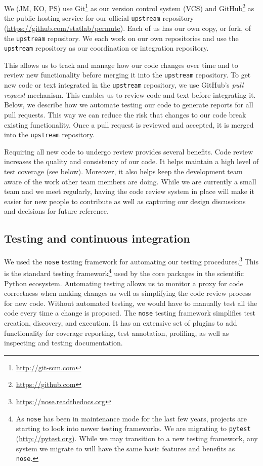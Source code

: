 \documentclass[]{article}
\begin{document}
We (JM, KO, PS) use Git\footnote{\url{http://git-scm.com}} as our version
control system (VCS) and GitHub\footnote{\url{https://github.com}} as the
public hosting service for our official \texttt{upstream} repository
(\url{https://github.com/statlab/permute}).
Each of us has our own copy, or fork, of the \texttt{upstream} repository.
We each work on our own repositories and use the \texttt{upstream} repository
as our coordination or integration repository.

This allows us to track and manage how our code changes over time and to
review new functionality before merging it into the \texttt{upstream}
repository.
To get new code or text integrated in the \texttt{upstream} repository, we use
GitHub's \emph{pull request} mechanism.
This enables us to review code and text before integrating it.
Below, we describe how we automate testing our code to generate reports for all
pull requests.
This way we can reduce the risk that changes to our code break existing
functionality.
Once a pull request is reviewed and accepted, it is merged into the
\texttt{upstream} repository.

Requiring all new code to undergo review provides several benefits.
Code review increases the quality and consistency of our code.
It helps maintain a high level of test coverage (see below).
Moreover, it also helps keep the development team aware of the work other team
members are doing.
While we are currently a small team and we meet regularly, having the code
review system in place will make it easier for new people to contribute as well
as capturing our design discussions and decisions for future reference.

\subsection{Testing and continuous integration}

We used the \texttt{nose} testing framework for automating our testing
procedures.\footnote{\url{https://nose.readthedocs.org}}
This is the standard testing framework\footnote{
    As \texttt{nose} has been in
    maintenance mode for the last few years, projects are starting to look
    into newer testing frameworks.
    We are migrating to \texttt{pytest} (\url{http://pytest.org}).
    While we may transition to a new testing framework, any system we
    migrate to will have the same basic features and benefits as \texttt{nose}.
}
used by the core packages in the scientific Python ecosystem.
Automating testing allows us to monitor a proxy for code correctness when
making changes as well as simplifying the code review process for new code.
Without automated testing, we would have to manually test all the code every
time a change is proposed.
The \texttt{nose} testing framework simplifies test creation, discovery, and
execution.
It has an extensive set of plugins to add functionality for coverage reporting,
test annotation, profiling, as well as inspecting and testing documentation.
\end{document}
